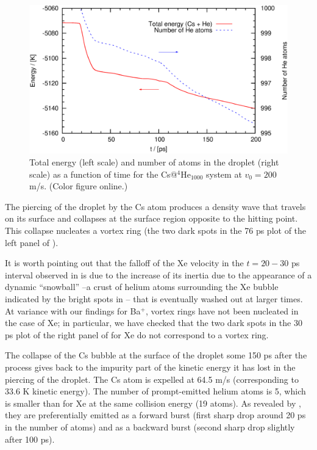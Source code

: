  
\begin{figure}[!]
\centerline{\includegraphics[width=0.90\linewidth,clip]{fig5}}
\caption{\label{fig5-headon} 
Total energy  (left scale) and number of atoms in the droplet (right scale) as a function of time for the 
Cs@$^4$He$_{1000}$ system at $v_0 = 200$ m/s. (Color figure online.)
}
\end{figure}

 
 The piercing of the droplet by the Cs atom produces a density wave that travels on its surface and collapses at the surface region opposite to the hitting point.
 This collapse nucleates a 
 vortex ring (the two dark spots in the 76 ps plot of the left panel of )\citep{Lea14a}.
 
 It is worth pointing out that the falloff of the Xe velocity in the $t=20-30$ ps interval observed in   is due to the increase of its inertia
due to the appearance of a dynamic ``snowball''  --a crust of helium atoms surrounding the Xe bubble indicated by the bright spots in 
-- that is eventually washed out at larger times.
At variance with our findings for Ba$^+$\citep{Mat14}, vortex rings have not been nucleated in the case of Xe; in particular, we have checked that the two dark spots  in the 30 ps plot of the right panel of  for Xe do not correspond to a vortex ring. 

The collapse of the Cs bubble at the surface of the droplet some 150 ps after the process 
 gives back to the impurity part of the kinetic energy it has lost  in the 
 piercing of the droplet. The Cs atom is expelled at 64.5 m/s (corresponding to 33.6 K kinetic energy). 
The number of prompt-emitted helium atoms is 5, which is smaller than for Xe at the same collision energy (19 atoms).
As revealed by , they are  preferentially emitted as a forward  burst  (first sharp drop around 20 ps in the number of atoms) and as a 
backward burst  (second sharp drop slightly after 100 ps).
